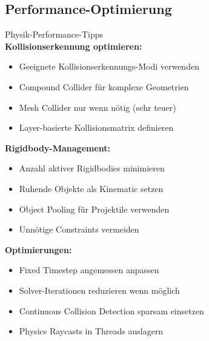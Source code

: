 \subsection{Performance-Optimierung}

\begin{concept}{Physik-Performance-Tipps}\\
    \textbf{Kollisionserkennung optimieren:}
    \begin{itemize}
        \item Geeignete Kollisionserkennungs-Modi verwenden
        \item Compound Collider für komplexe Geometrien
        \item Mesh Collider nur wenn nötig (sehr teuer)
        \item Layer-basierte Kollisionsmatrix definieren
    \end{itemize}
    
    \textbf{Rigidbody-Management:}
    \begin{itemize}
        \item Anzahl aktiver Rigidbodies minimieren
        \item Ruhende Objekte als Kinematic setzen
        \item Object Pooling für Projektile verwenden
        \item Unnötige Constraints vermeiden
    \end{itemize}
    
    \textbf{Optimierungen:}
    \begin{itemize}
        \item Fixed Timestep angemessen anpassen
        \item Solver-Iterationen reduzieren wenn möglich
        \item Continuous Collision Detection sparsam einsetzen
        \item Physics Raycasts in Threads auslagern
    \end{itemize}
\end{concept}

